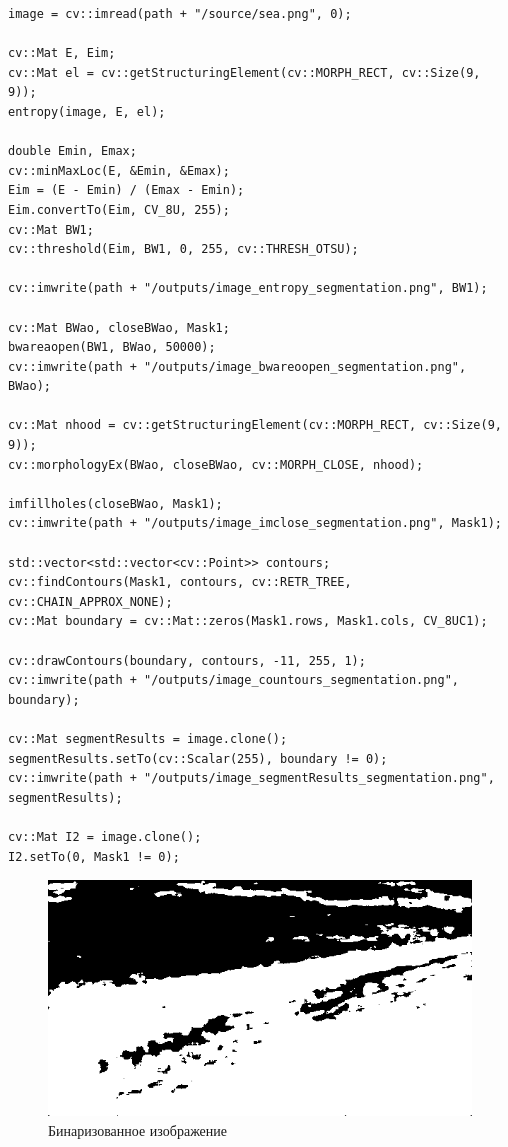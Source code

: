 \begin{lstlisting}[style=cpp_white, caption={Текстурная сегментация}]
image = cv::imread(path + "/source/sea.png", 0);

cv::Mat E, Eim;
cv::Mat el = cv::getStructuringElement(cv::MORPH_RECT, cv::Size(9, 9));
entropy(image, E, el);

double Emin, Emax;
cv::minMaxLoc(E, &Emin, &Emax);
Eim = (E - Emin) / (Emax - Emin);
Eim.convertTo(Eim, CV_8U, 255);
cv::Mat BW1;
cv::threshold(Eim, BW1, 0, 255, cv::THRESH_OTSU);

cv::imwrite(path + "/outputs/image_entropy_segmentation.png", BW1);

cv::Mat BWao, closeBWao, Mask1;
bwareaopen(BW1, BWao, 50000);
cv::imwrite(path + "/outputs/image_bwareoopen_segmentation.png", BWao);

cv::Mat nhood = cv::getStructuringElement(cv::MORPH_RECT, cv::Size(9, 9));
cv::morphologyEx(BWao, closeBWao, cv::MORPH_CLOSE, nhood);

imfillholes(closeBWao, Mask1);
cv::imwrite(path + "/outputs/image_imclose_segmentation.png", Mask1);

std::vector<std::vector<cv::Point>> contours;
cv::findContours(Mask1, contours, cv::RETR_TREE, cv::CHAIN_APPROX_NONE);
cv::Mat boundary = cv::Mat::zeros(Mask1.rows, Mask1.cols, CV_8UC1);

cv::drawContours(boundary, contours, -11, 255, 1);
cv::imwrite(path + "/outputs/image_countours_segmentation.png", boundary);

cv::Mat segmentResults = image.clone();
segmentResults.setTo(cv::Scalar(255), boundary != 0);
cv::imwrite(path + "/outputs/image_segmentResults_segmentation.png", segmentResults);

cv::Mat I2 = image.clone();
I2.setTo(0, Mask1 != 0);
\end{lstlisting}

\begin{figure}[h!]
    \includegraphics[width=\textwidth]{../outputs/image_entropy_segmentation.png}
    \caption{Бинаризованное изображение}
    \label{fig:р}
\end{figure}

